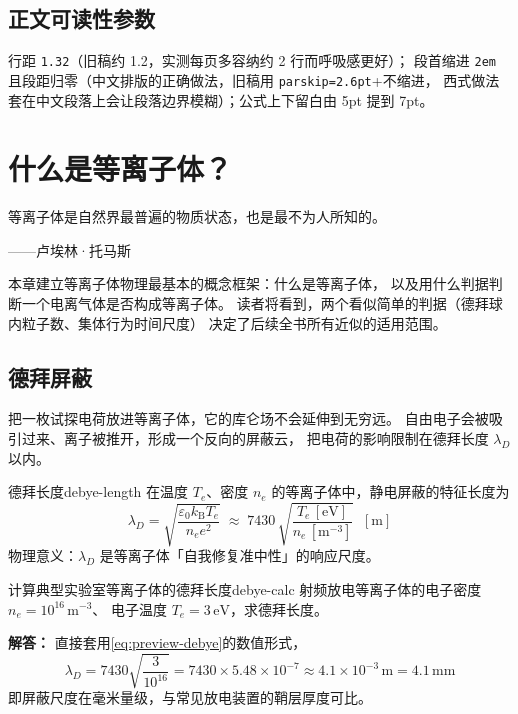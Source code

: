 \documentclass[11pt,a4paper,openany,oneside]{book}
\newcommand{\eps}{\varepsilon}
\newcommand{\difficulty}[1]{%
  \marginnote{\raggedleft
    \tikz[baseline=(m.base)]{%
      \node[fill=diffMark!12, draw=diffMark!55, line width=0.4pt,
            rounded corners=4pt, inner xsep=4pt, inner ysep=1.6pt,
            text=diffMark, font=\scriptsize\heiti] (m) {#1};}%
    \hspace{1.2mm}}%
}
\begin{document}
\section*{正文可读性参数}
\noindent 行距 \texttt{1.32}（旧稿约 1.2，实测每页多容纳约 2 行而呼吸感更好）；
段首缩进 \texttt{2em} 且段距归零（中文排版的正确做法，旧稿用 \texttt{parskip=2.6pt}+不缩进，
西式做法套在中文段落上会让段落边界模糊）；公式上下留白由 5pt 提到 7pt。

\clearpage

\chapter{什么是等离子体？}
\label{ch:preview-2}

\epigraph{等离子体是自然界最普遍的物质状态，也是最不为人所知的。}
         {——卢埃林·托马斯}

\noindent 本章建立等离子体物理最基本的概念框架：什么是等离子体，
以及用什么判据判断一个电离气体是否构成等离子体。
读者将看到，两个看似简单的判据（德拜球内粒子数、集体行为时间尺度）
决定了后续全书所有近似的适用范围。

\difficulty{基础}

\section{德拜屏蔽}

\noindent 把一枚试探电荷放进等离子体，它的库仑场不会延伸到无穷远。
自由电子会被吸引过来、离子被推开，形成一个反向的屏蔽云，
把电荷的影响限制在德拜长度 $\lambda_D$ 以内。

\begin{definition}{德拜长度}{debye-length}
在温度 $T_e$、密度 $n_e$ 的等离子体中，静电屏蔽的特征长度为
\begin{equation}
  \lambda_D = \sqrt{\frac{\eps_0 k_\mathrm{B} T_e}{n_e e^2}}
  \;\approx\; 7430\,\sqrt{\frac{T_e\,[\mathrm{eV}]}{n_e\,[\mathrm{m^{-3}}]}}
  \;\;\mathrm{[m]}
  \label{eq:preview-debye}
\end{equation}
物理意义：$\lambda_D$ 是等离子体「自我修复准中性」的响应尺度。
\end{definition}

\begin{example}{计算典型实验室等离子体的德拜长度}{debye-calc}
射频放电等离子体的电子密度 $n_e=10^{16}\,\mathrm{m^{-3}}$、
电子温度 $T_e=3\,\mathrm{eV}$，求德拜长度。

\medskip
\textbf{解答：} 直接套用\cref{eq:preview-debye}的数值形式，
\begin{equation*}
  \lambda_D = 7430\sqrt{\frac{3}{10^{16}}}
            = 7430 \times 5.48\times10^{-7}
            \approx 4.1\times10^{-3}\,\mathrm{m} = 4.1\,\mathrm{mm}
\end{equation*}
即屏蔽尺度在毫米量级，与常见放电装置的鞘层厚度可比。
\end{example}
\end{document}
